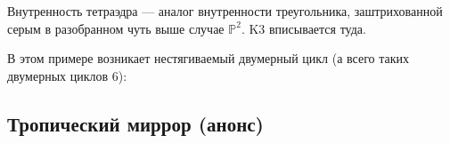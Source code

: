 \documentclass[11pt]{article}
\theoremstyle{remark}
\theoremstyle{definition}
\begin{document}
Внутренность тетраэдра --- аналог внутренности треугольника, заштрихованной серым в разобранном чуть выше случае $\mathbb{P}^2$. K3 вписывается туда.

В этом примере возникает нестягиваемый двумерный цикл (а всего таких двумерных циклов 6):

\begin{center}
\end{center}

\subsection{Тропический миррор (анонс)}
\end{document}
